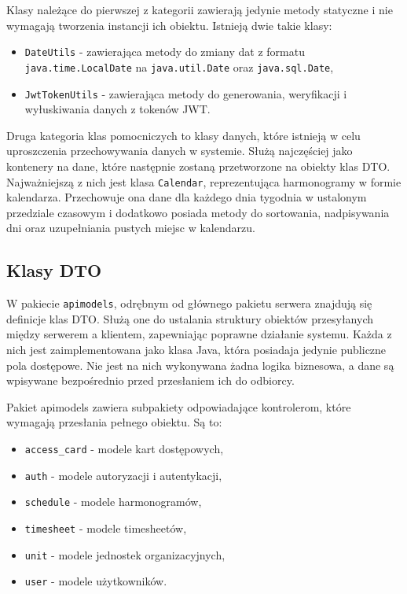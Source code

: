 Klasy należące do pierwszej z kategorii zawierają jedynie metody statyczne i nie wymagają tworzenia instancji ich obiektu. Istnieją dwie takie klasy:
\begin{itemize}
    \item \texttt{DateUtils} - zawierająca metody do zmiany dat z formatu \texttt{java.time.LocalDate} na \texttt{java.util.Date} oraz \texttt{java.sql.Date},
    \item \texttt{JwtTokenUtils} - zawierająca metody do generowania, weryfikacji i wyłuskiwania danych z tokenów JWT.
\end{itemize}

Druga kategoria klas pomocniczych to klasy danych, które istnieją w celu uproszczenia przechowywania danych w systemie. Służą najczęściej jako kontenery na dane, które następnie zostaną przetworzone na obiekty klas DTO. Najważniejszą z nich jest klasa \texttt{Calendar}, reprezentująca harmonogramy w formie kalendarza. Przechowuje ona dane dla każdego dnia tygodnia w ustalonym przedziale czasowym i dodatkowo posiada metody do sortowania, nadpisywania dni oraz uzupełniania pustych miejsc w kalendarzu.

\subsection{Klasy DTO}

W pakiecie \texttt{apimodels}, odrębnym od głównego pakietu serwera znajdują się definicje klas DTO. Służą one do ustalania struktury obiektów przesyłanych między serwerem a klientem, zapewniając poprawne działanie systemu. Każda z nich jest zaimplementowana jako klasa Java, która posiadaja jedynie publiczne pola dostępowe. Nie jest na nich wykonywana żadna logika biznesowa, a dane są wpisywane bezpośrednio przed przesłaniem ich do odbiorcy.

Pakiet apimodels zawiera subpakiety odpowiadające kontrolerom, które wymagają przesłania pełnego obiektu. Są to:
\begin{itemize}
    \item \texttt{access\_card} - modele kart dostępowych,
    \item \texttt{auth} - modele autoryzacji i autentykacji,
    \item \texttt{schedule} - modele harmonogramów,
    \item \texttt{timesheet} - modele timesheetów,
    \item \texttt{unit} - modele jednostek organizacyjnych,
    \item \texttt{user} - modele użytkowników.
\end{itemize}

